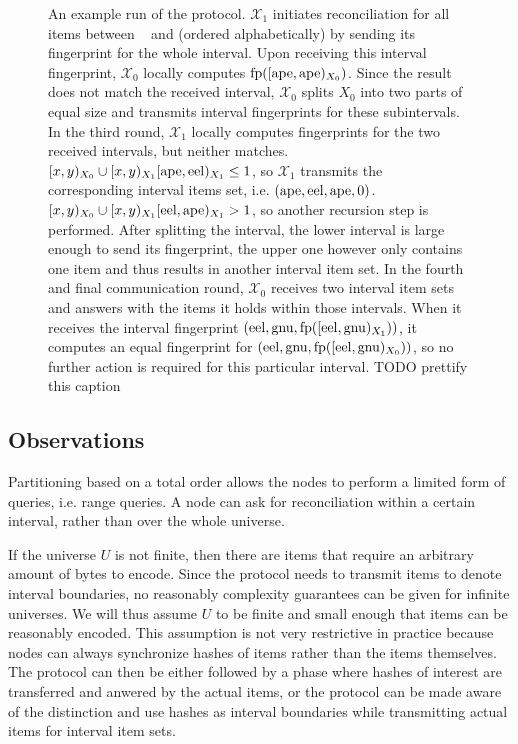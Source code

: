 \begin{figure*}
\caption{
An example run of the protocol. $\mathcal{X}_1$ initiates reconciliation for all items between \examplea~ and \examplei (ordered alphabetically) by sending its fingerprint for the whole interval.
Upon receiving this interval fingerprint, $\mathcal{X}_0$ locally computes $\operatorname{fp}([{\mathrm{ape}},{\mathrm{ape}})_{X_0})$. Since the result does not match the received interval, $\mathcal{X}_0$ splits $X_0$ into two parts of equal size and transmits interval fingerprints for these subintervals.
In the third round, $\mathcal{X}_1$ locally computes fingerprints for the two received intervals, but neither matches. $[{x},{y})_{X_0} \cup [{x},{y})_{X_1}{[{\mathrm{ape}},{\mathrm{eel}})_{X_1}} \leq 1$, so $\mathcal{X}_1$ transmits the corresponding interval items set, i.e. $({\mathrm{ape}}, {\mathrm{eel}}, {\mathrm{ape}}, {0})$. $[{x},{y})_{X_0} \cup [{x},{y})_{X_1}{[{\mathrm{eel}},{\mathrm{ape}})_{X_1}} > 1$, so another recursion step is performed. After splitting the interval, the lower interval is large enough to send its fingerprint, the upper one however only contains one item and thus results in another interval item set.
In the fourth and final communication round, $\mathcal{X}_0$ receives two interval item sets and answers with the items it holds within those intervals. When it receives the interval fingerprint $({\mathrm{eel}}, {\mathrm{gnu}}, {\operatorname{fp}([{\mathrm{eel}},{\mathrm{gnu}})_{X_1})})$, it computes an equal fingerprint for $({\mathrm{eel}}, {\mathrm{gnu}}, {\operatorname{fp}([{\mathrm{eel}},{\mathrm{gnu}})_{X_0})})$, so no further action is required for this particular interval. TODO prettify this caption
}

\label{simple-set-reconciliation-example}
\end{figure*}

\subsection{Observations}
\label{observations}

Partitioning based on a total order allows the nodes to perform a limited form of queries, i.e. range queries. A node can ask for reconciliation within a certain interval, rather than over the whole universe.

If the universe $U$ is not finite, then there are items that require an arbitrary amount of bytes to encode. Since the protocol needs to transmit items to denote interval boundaries, no reasonably complexity guarantees can be given for infinite universes. We will thus assume $U$ to be finite and small enough that items can be reasonably encoded. This assumption is not very restrictive in practice because nodes can always synchronize hashes of items rather than the items themselves. The protocol can then be either followed by a phase where hashes of interest are transferred and anwered by the actual items, or the protocol can be made aware of the distinction and use hashes as interval boundaries while transmitting actual items for interval item sets.

